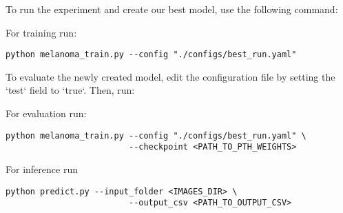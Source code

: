 To run the experiment and create our best model, use the following command:

For training run:
\begin{lstlisting}
python melanoma_train.py --config "./configs/best_run.yaml"
\end{lstlisting}

To evaluate the newly created model, edit the configuration file  by setting the `test` field to `true`. Then, run:

For evaluation run:
\begin{lstlisting}
python melanoma_train.py --config "./configs/best_run.yaml" \
                         --checkpoint <PATH_TO_PTH_WEIGHTS>
\end{lstlisting}

For inference run 

\begin{lstlisting}
python predict.py --input_folder <IMAGES_DIR> \
                         --output_csv <PATH_TO_OUTPUT_CSV>
\end{lstlisting}
